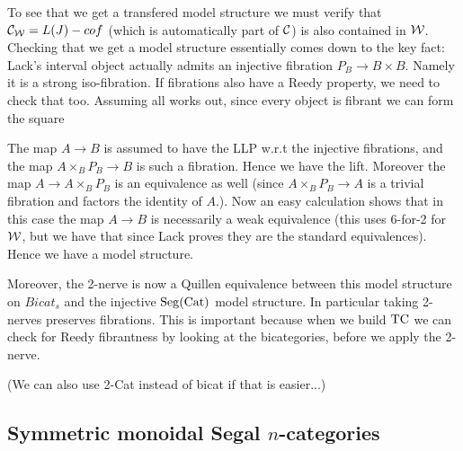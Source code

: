 \documentclass[a4paper]{amsart}
\begin{document}
{To see that we get a transfered model structure we must verify that $\mathcal C_\mathcal W = L(J)-cof$ (which is automatically part of $\mathcal C$) is also contained in $\mathcal W$.  Checking that we get a model structure essentially comes down to the  key fact: Lack's interval object actually admits an injective fibration $P_B \to B \times B$. Namely it is a strong iso-fibration. If fibrations also have a Reedy property, we need to check that too. Assuming all works out, since every object is fibrant we can form the square
\begin{center}
\end{center}
The map $A \to B$ is assumed to have the LLP w.r.t the injective fibrations, and the map $A \times_B P_B \to B$ is such a fibration. Hence we have the lift. Moreover the map $A \to A \times_B P_B$ is an equivalence as well (since $A \times_B P_B \to A$ is a trivial fibration and factors the identity of $A$.). 
 Now an easy calculation shows that in this case the map $A \to B$ is necessarily  a weak equivalence (this uses 6-for-2 for $\mathcal W$, but we have that since Lack proves they are the standard equivalences). Hence we have a model structure. 

Moreover, the 2-nerve is now a Quillen equivalence between this model structure on $Bicat_s$ and the injective $\mathrm{Seg}(\mathrm{Cat})$ model structure. In particular taking 2-nerves preserves fibrations. This is important because when we build $\mathrm{TC}$ we can check for Reedy fibrantness by looking at the bicategories, before we apply the 2-nerve. 

(We can also use 2-Cat instead of bicat if that is easier...)

}


\subsection{Symmetric monoidal Segal $n$-categories} \label{sec-symmoninftyNcat}

\end{document}
